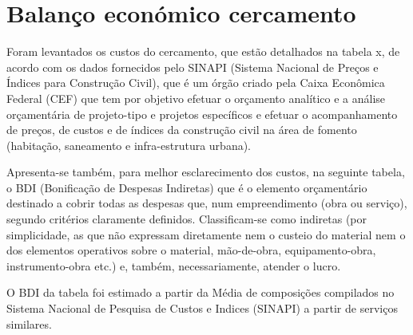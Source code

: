 \section{Balanço económico cercamento}

 Foram levantados os custos do cercamento, que estão detalhados na tabela x, de acordo com os dados fornecidos pelo SINAPI (Sistema Nacional de Preços e Índices para Construção Civil), que é um órgão criado pela Caixa Econômica Federal (CEF) que tem por objetivo efetuar o orçamento analítico e a análise orçamentária de projeto-tipo e projetos específicos e efetuar o acompanhamento de preços, de custos e de índices da construção civil na área de fomento (habitação, saneamento e infra-estrutura urbana). 
 
Apresenta-se também, para melhor esclarecimento dos custos, na seguinte tabela, o BDI (Bonificação de Despesas Indiretas) que é o elemento orçamentário destinado a cobrir todas as despesas que, num empreendimento (obra ou serviço), segundo critérios claramente definidos. Classificam-se como indiretas (por simplicidade, as que não expressam diretamente nem o custeio do material nem o dos elementos operativos sobre o material, mão-de-obra, equipamento-obra, instrumento-obra etc.) e, também, necessariamente, atender o lucro.

O BDI da tabela foi estimado a partir da Média de composições compilados no Sistema Nacional de Pesquisa de Custos e Indices (SINAPI) a partir de serviços similares.




